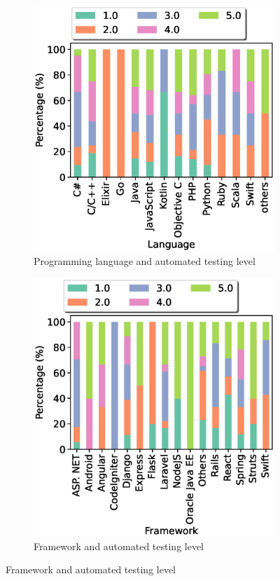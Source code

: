 \begin{figure}[t]
    \centering
    \caption{Analysis of automated testing level}
    \begin{subfigure}{0.5\textwidth}
        \includegraphics[scale=0.4]{Figures/Language_and_Test_Level}
          \caption{Programming language and automated testing level}
          \label{fig:language and autotest}
    \end{subfigure}
    \begin{subfigure}{0.4\textwidth}
          \includegraphics[scale=0.4]{Figures/Framework_and_Test_Level}
          \caption{Framework and automated testing level}
          \label{fig:framework and autotest}
    \end{subfigure}
\end{figure}


